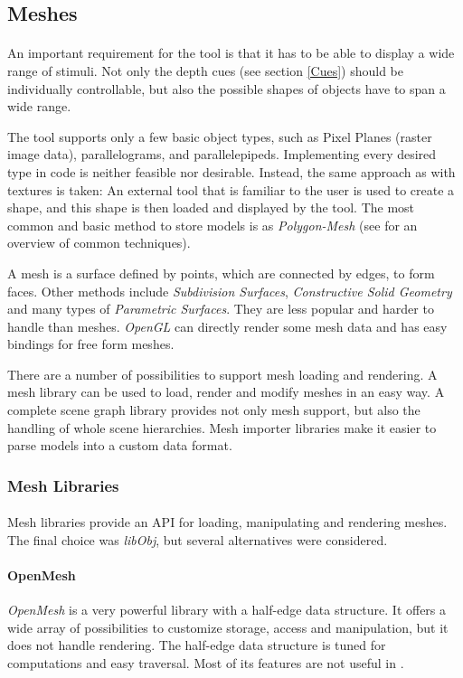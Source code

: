 \subsection{Meshes\label{Meshes}}
\paragraph{}
An important requirement for the tool is that it has to be able to display a wide range of stimuli.
Not only the depth cues (see section \ref{Cues}) should be individually controllable, but also the possible shapes of objects have to span a wide range.

The tool supports only a few basic object types, such as Pixel Planes (raster image data), parallelograms, and parallelepipeds. Implementing every desired type in code is neither feasible nor desirable.
Instead, the same approach as with textures is taken: An external tool that is familiar to the user is used to create a shape, and this shape is then loaded and displayed by the tool.
The most common and basic method to store models is as \textit{Polygon-Mesh} (see \cite{MeshPop} for an overview of common techniques).

A mesh is a surface defined by points, which are connected by edges, to form faces. Other methods include \textit{Subdivision Surfaces}, \textit{Constructive Solid Geometry} and many types of \textit{Parametric Surfaces}.
They are less popular and harder to handle than meshes.
\textit{OpenGL} can directly render some mesh data and has easy bindings for free form meshes.

There are a number of possibilities to support mesh loading and rendering.
A mesh library can be used to load, render and modify meshes in an easy way.
A complete scene graph library provides not only mesh support, but also the handling of whole scene hierarchies.
Mesh importer libraries make it easier to parse models into a custom data format.


\subsubsection{Mesh Libraries}
\paragraph{}
Mesh libraries provide an API for loading, manipulating and rendering meshes.
The final choice was \textit{libObj}, but several alternatives were considered.

\paragraph{OpenMesh}
\textit{OpenMesh} is a very powerful library with a half-edge data structure.
It offers a wide array of possibilities to customize storage, access and manipulation,
but it does not handle rendering.
The half-edge data structure is tuned for computations and easy traversal.
Most of its features are not useful in \ER.

